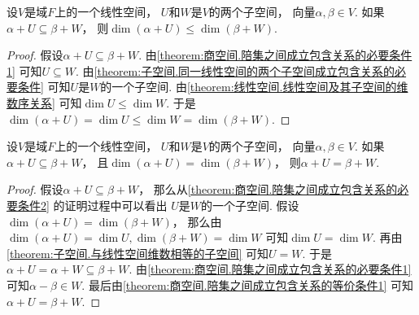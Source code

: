 \begin{theorem}\label{theorem:商空间.陪集之间成立包含关系的必要条件2}
设\(V\)是域\(F\)上的一个线性空间，
\(U\)和\(W\)是\(V\)的两个子空间，
向量\(\alpha,\beta \in V\).
如果\(\alpha + U \subseteq \beta + W\)，
则\(\dim(\alpha + U) \leq \dim(\beta + W)\).
\begin{proof}
假设\(\alpha + U \subseteq \beta + W\).
由\cref{theorem:商空间.陪集之间成立包含关系的必要条件1}
可知\(U \subseteq W\).
由\cref{theorem:子空间.同一线性空间的两个子空间成立包含关系的必要条件}
可知\(U\)是\(W\)的一个子空间.
由\cref{theorem:线性空间.线性空间及其子空间的维数序关系}
可知\(\dim U \leq \dim W\).
于是\(
	\dim(\alpha + U)
	= \dim U
	\leq \dim W
	= \dim(\beta + W)
\).
\end{proof}
\end{theorem}

\begin{theorem}
设\(V\)是域\(F\)上的一个线性空间，
\(U\)和\(W\)是\(V\)的两个子空间，
向量\(\alpha,\beta \in V\).
如果\(\alpha + U \subseteq \beta + W\)，
且\(\dim(\alpha + U) = \dim(\beta + W)\)，
则\(\alpha + U = \beta + W\).
\begin{proof}
假设\(\alpha + U \subseteq \beta + W\)，
那么从\cref{theorem:商空间.陪集之间成立包含关系的必要条件2} 的证明过程中可以看出
\(U\)是\(W\)的一个子空间.
假设\(\dim(\alpha + U) = \dim(\beta + W)\)，
那么由\(
	\dim(\alpha + U) = \dim U,
	\dim(\beta + W) = \dim W
\)
可知\(\dim U = \dim W\).
再由\cref{theorem:子空间.与线性空间维数相等的子空间}
可知\(U = W\).
于是\(\alpha + U = \alpha + W \subseteq \beta + W\).
由\cref{theorem:商空间.陪集之间成立包含关系的必要条件1}
可知\(\alpha - \beta \in W\).
最后由\cref{theorem:商空间.陪集之间成立包含关系的等价条件1}
可知\(\alpha + U = \beta + W\).
\end{proof}
\end{theorem}

